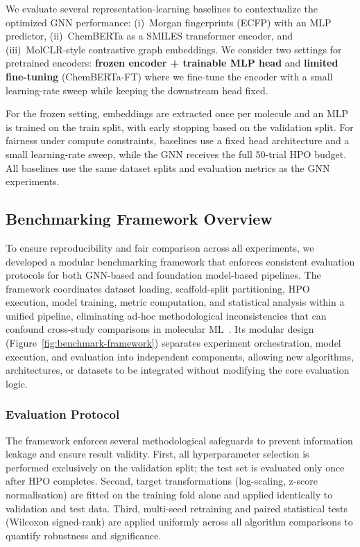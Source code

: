 \documentclass[12pt]{article}
\begin{document}
We evaluate several representation-learning baselines to contextualize the optimized GNN performance: (i)~Morgan fingerprints (ECFP) with an MLP predictor, (ii)~ChemBERTa as a SMILES transformer encoder, and (iii)~MolCLR-style contrastive graph embeddings. We consider two settings for pretrained encoders: \textbf{frozen encoder + trainable MLP head} and \textbf{limited fine-tuning} (ChemBERTa-FT) where we fine-tune the encoder with a small learning-rate sweep while keeping the downstream head fixed.

For the frozen setting, embeddings are extracted once per molecule and an MLP is trained on the train split, with early stopping based on the validation split. For fairness under compute constraints, baselines use a fixed head architecture and a small learning-rate sweep, while the GNN receives the full 50-trial HPO budget. All baselines use the same dataset splits and evaluation metrics as the GNN experiments.

\subsection{Benchmarking Framework Overview}
To ensure reproducibility and fair comparison across all experiments, we developed a modular benchmarking framework that enforces consistent evaluation protocols for both GNN-based and foundation model-based pipelines. The framework coordinates dataset loading, scaffold-split partitioning, HPO execution, model training, metric computation, and statistical analysis within a unified pipeline, eliminating ad-hoc methodological inconsistencies that can confound cross-study comparisons in molecular ML~\cite{wu2018moleculenet}. Its modular design (Figure~\ref{fig:benchmark-framework}) separates experiment orchestration, model execution, and evaluation into independent components, allowing new algorithms, architectures, or datasets to be integrated without modifying the core evaluation logic.

\subsubsection{Evaluation Protocol}
The framework enforces several methodological safeguards to prevent information leakage and ensure result validity. First, all hyperparameter selection is performed exclusively on the validation split; the test set is evaluated only once after HPO completes. Second, target transformations (log-scaling, z-score normalisation) are fitted on the training fold alone and applied identically to validation and test data. Third, multi-seed retraining and paired statistical tests (Wilcoxon signed-rank) are applied uniformly across all algorithm comparisons to quantify robustness and significance.
\end{document}
